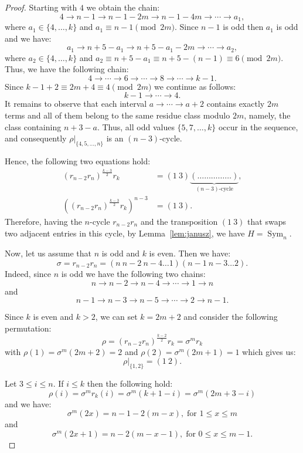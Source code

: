\documentclass[10pt,a4paper]{amsart}
\theoremstyle{plain}
\theoremstyle{definition}
\DeclareMathOperator{\Sym}{\mathrm{Sym}}
\begin{document}
\begin{proof}
Starting with \(4\) we obtain the chain:
\[
4 \rightarrow n-1 \rightarrow n-1-2m \rightarrow n-1-4m \rightarrow\cdots\rightarrow a_1, 
\]
where $a_1 \in \{4, \dots, k\}$ and $a_1 \equiv n-1 \pmod{2m}$. Since $n-1$ is odd then $a_1$ is odd and we have: 
\[
a_1 \rightarrow n + 5-a_1 \rightarrow n + 5-a_1 - 2m \rightarrow\cdots\rightarrow a_2,
\]
where $a_2 \in \{4, \dots, k\}$ and  $a_2 \equiv n + 5-a_1 \equiv  n + 5 -(n-1) \equiv 6 \pmod{2m}$. Thus, we have the following chain:
\[
4 \rightarrow \cdots \rightarrow 6 \rightarrow \cdots \rightarrow 8 \rightarrow \cdots \rightarrow k-1.
\]
Since $k-1 + 2 \equiv 2m+4 \equiv 4 \pmod{2m}$ we continue as follows: 
\[
k-1 \rightarrow \cdots \rightarrow 4.
\]
It remains to observe that each interval $a \rightarrow \cdots \rightarrow a+2$ contains exactly $2m$ terms and all of them belong to the same residue class modulo $2m$, namely, the class containing $n+3-a$. Thus, all odd values $\{5,7,\dots,k\}$ occur in the sequence, and consequently $\rho|_{\{4,5,\dots,n\}}$
is an $(n-3)$-cycle.

Hence, the following two equations hold: 
\begin{align*} (r_{n-2}r_n)^{\frac{k-3}{2}}r_k &= (1\ 3) \underbrace{(\dots \ldots \ldots \ldots \ldots)}_{\text{$(n-3)$-cycle}}, \\
((r_{n-2}r_n)^{\frac{k-3}{2}}r_k)^{n-3}&= (1\ 3). 
\end{align*}
Therefore, having the $n$-cycle $r_{n-2}r_n$ and the transposition $(1\ 3)$ that swaps two adjacent entries in this cycle, by Lemma~\ref{lem:janusz}, we have $H=\Sym_n$.

Now, let us assume that $n$ is odd and $k$ is even. Then we have: 
$$\sigma=r_{n-2} r_n=(n\ n-2\ n-4\dots 1)(n-1\ n-3 \dots 2).$$ 
Indeed, since $n$ is odd we have the following two chains:
\[
n \rightarrow n-2 \rightarrow n-4 \rightarrow\cdots\rightarrow 1 \rightarrow n
\]
and 
\[
n-1 \rightarrow n-3 \rightarrow n-5 \rightarrow\cdots\rightarrow 2 \rightarrow n-1.
\]

Since $k$ is even and $k > 2$, we can set $k=2m+2$ and consider the following permutation:
\[
\rho  = (r_{n-2}r_n)^{\frac{k-2}{2}}r_k = \sigma^{m}r_k
\]
with $\rho(1) = \sigma^{m}(2m+2) = 2$ and $\rho(2) = \sigma^{m}(2m+1) = 1$ which gives us: $$\rho\vert_{\{1,2\}} = (1\ 2).$$

Let $3 \leqslant i \leqslant n$. If $i \leqslant k$ then the following hold: 
\[
\rho(i) = \sigma^{m}r_k(i) = \sigma^{m}(k+1-i) = \sigma^{m}(2m+3-i) 
\]
and we have: 
\[
\sigma^{m}(2x) = n-1-2(m-x), \; \text{for } 1 \leqslant x \leqslant m
\]
and
\[
\sigma^{m}(2x+1) = n-2(m-x-1), \; \text{for } 0 \leqslant x \leqslant m-1.
\]


\end{proof}
\end{document}
